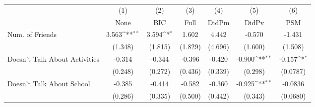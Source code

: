 {
\def\sym#1{\ifmmode^{#1}\else\(^{#1}\)\fi}
\begin{tabular}{l*{6}{c}}
\toprule
            &\multicolumn{1}{c}{(1)}&\multicolumn{1}{c}{(2)}&\multicolumn{1}{c}{(3)}&\multicolumn{1}{c}{(4)}&\multicolumn{1}{c}{(5)}&\multicolumn{1}{c}{(6)}\\
            &\multicolumn{1}{c}{None}&\multicolumn{1}{c}{BIC}&\multicolumn{1}{c}{Full}&\multicolumn{1}{c}{DidPm}&\multicolumn{1}{c}{DidPv}&\multicolumn{1}{c}{PSM}\\
\midrule
Num. of Friends&       3.563\sym{**} &       3.594\sym{*}  &       1.602         &       4.442         &      -0.570         &      -1.431         \\
            &     (1.348)         &     (1.815)         &     (1.829)         &     (4.696)         &     (1.600)         &     (1.508)         \\
\addlinespace
Doesn't Talk About Activities&      -0.314         &      -0.344         &      -0.396         &      -0.420         &      -0.900\sym{**} &      -0.157\sym{*}  \\
            &     (0.248)         &     (0.272)         &     (0.436)         &     (0.339)         &     (0.298)         &    (0.0787)         \\
\addlinespace
Doesn't Talk About School&      -0.385         &      -0.414         &      -0.582         &      -0.360         &      -0.925\sym{**} &     -0.0836         \\
            &     (0.286)         &     (0.335)         &     (0.500)         &     (0.442)         &     (0.343)         &    (0.0680)         \\
\bottomrule
\end{tabular}
}
